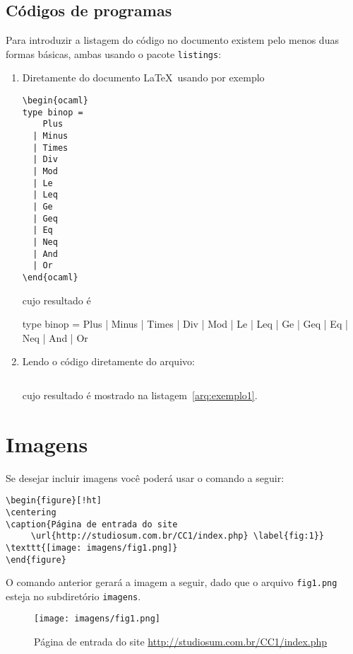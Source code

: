 \documentclass[12pt,a4paper,twoside]{report}
\begin{document}
\section{Códigos de programas}
Para introduzir a listagem do código no documento existem pelo menos duas
formas básicas, ambas usando o pacote \verb|listings|:
\begin{enumerate}
\item Diretamente do documento \LaTeX\ usando por exemplo
\begin{verbatim}
\begin{ocaml}
type binop =
    Plus
  | Minus
  | Times
  | Div
  | Mod
  | Le
  | Leq
  | Ge
  | Geq
  | Eq
  | Neq
  | And
  | Or
\end{ocaml}
\end{verbatim}
cujo resultado é
\begin{ocaml}
type binop =
    Plus
  | Minus
  | Times
  | Div
  | Mod
  | Le
  | Leq
  | Ge
  | Geq
  | Eq
  | Neq
  | And
  | Or
\end{ocaml}  
\item Lendo o código diretamente do arquivo:
\begin{verbatim}

\end{verbatim}
cujo resultado é mostrado na listagem~\ref{arq:exemplo1}.


\end{enumerate}

\chapter{Imagens}

Se desejar incluir imagens você poderá usar o comando a seguir:

\begin{verbatim}
\begin{figure}[!ht]
\centering
\caption{Página de entrada do site 
     \url{http://studiosum.com.br/CC1/index.php} \label{fig:1}}
\texttt{[image: imagens/fig1.png]}
\end{figure}
\end{verbatim}

O comando anterior gerará a imagem a seguir, dado que o arquivo \texttt{fig1.png} esteja no subdiretório \texttt{imagens}.
\begin{figure}[!h]
\centering
\caption{Página de entrada do site \url{http://studiosum.com.br/CC1/index.php} \label{fig:1}}
\texttt{[image: imagens/fig1.png]}
\end{figure}
\end{document}
